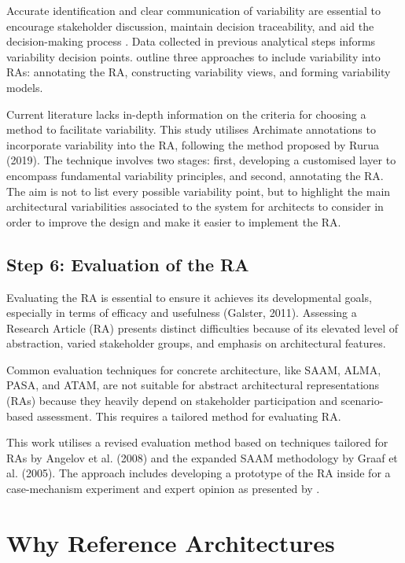 \documentclass[preprint,12pt]{elsarticle}
\begin{document}
Accurate identification and clear communication of variability are essential to encourage stakeholder discussion, maintain decision traceability, and aid the decision-making process \cite{czarnecki2012cool}. Data collected in previous analytical steps informs variability decision points. \citeauthor{galster2011empirically} outline three approaches to include variability into RAs: annotating the RA, constructing variability views, and forming variability models.

Current literature lacks in-depth information on the criteria for choosing a method to facilitate variability. This study utilises Archimate annotations to incorporate variability into the RA, following the method proposed by Rurua (2019). The technique involves two stages: first, developing a customised layer to encompass fundamental variability principles, and second, annotating the RA. The aim is not to list every possible variability point, but to highlight the main architectural variabilities associated to the system for architects to consider in order to improve the design and make it easier to implement the RA.

\subsection{Step 6: Evaluation of the RA}

Evaluating the RA is essential to ensure it achieves its developmental goals, especially in terms of efficacy and usefulness (Galster, 2011). Assessing a Research Article (RA) presents distinct difficulties because of its elevated level of abstraction, varied stakeholder groups, and emphasis on architectural features.

Common evaluation techniques for concrete architecture, like SAAM, ALMA, PASA, and ATAM, are not suitable for abstract architectural representations (RAs) because they heavily depend on stakeholder participation and scenario-based assessment. This requires a tailored method for evaluating RA.

This work utilises a revised evaluation method based on techniques tailored for RAs by Angelov et al. (2008) and the expanded SAAM methodology by Graaf et al. (2005). The approach includes developing a prototype of the RA inside for a case-mechanism experiment  and expert opinion as presented by \citeauthor{wieringa2014design}.

\section{Why Reference Architectures}
\label{sec:why_reference_architectures}
\end{document}

